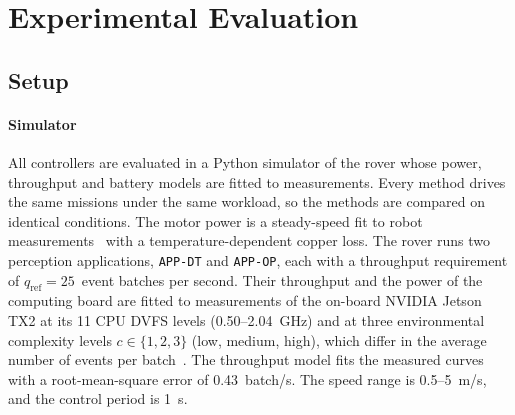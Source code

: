 
\section{Experimental Evaluation}
\label{sec:exp}

\subsection{Setup}
\label{sec:exp:setup}

\paragraph{Simulator}
All controllers are evaluated in a Python simulator of the rover whose power, throughput and
battery models are fitted to measurements. Every method drives the same missions under the
same workload, so the methods are compared on identical conditions.
The motor power is a steady-speed fit to robot measurements~\cite{naseri2025co} with a
temperature-dependent copper loss. The rover runs two perception applications,
\texttt{APP-DT} and \texttt{APP-OP}, each with a throughput requirement of
$q_{\mathrm{ref}} = 25$~event batches per second. Their throughput and the power of the
computing board are fitted to measurements of the on-board NVIDIA Jetson TX2 at its 11 \ac{CPU}
\ac{DVFS} levels (0.50--2.04~GHz) and at three environmental complexity levels
$c \in \{1, 2, 3\}$ (low, medium, high), which differ in the average number of events per
batch~\cite{shahsavari2024coordinated}. The throughput model fits the measured curves with
a root-mean-square error of 0.43~batch/s. The speed range is 0.5--5~m/s, and the control
period is 1~s.

